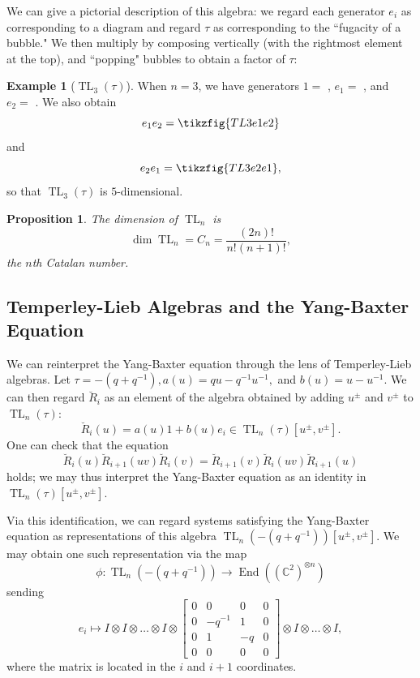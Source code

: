 \documentclass[12pt]{amsart}
\numberwithin{equation}{section}
\newtheorem{Proposition}[equation]{Proposition}
\theoremstyle{definition}
\newtheorem{Example}[equation]{Example}
\numberwithin{figure}{section}
\newcommand{\C}{\mathbb{C}}
\newcommand{\on}[1]{\operatorname{#1}}
\newcommand{\TeL}{\on{TL}}
\newcommand{\Rcheck}{\breve{R}}
\begin{document}
We can give a pictorial description of this algebra: we regard each generator $e_i$ as corresponding to a diagram
and regard $\tau$ as corresponding to the ``fugacity of a bubble." We then multiply by composing vertically (with the rightmost element at the top), and ``popping" bubbles to obtain a factor of $\tau$:

\begin{Example}[$\TeL_3(\tau)$]
	When $n=3$, we have generators $1 = $ , $e_1 = $ , and $e_2 = $ . We also obtain
	\[e_1 e_2 = \tikzfig{TL3e1e2}\]
	and 
	\[e_2 e_1 = \tikzfig{TL3e2e1},\]
	so that $\TeL_3(\tau)$ is $5$-dimensional.
\end{Example}



\begin{Proposition}
	The dimension of $\TeL_n$ is
	\[\dim \TeL_n = C_n = \frac{(2n)!}{n!(n+1)!},\]
	the $n$th Catalan number.
\end{Proposition}

\subsection{Temperley-Lieb Algebras and the Yang-Baxter Equation} We can reinterpret the Yang-Baxter equation through the lens of Temperley-Lieb algebras. Let $\tau = -(q+q^{-1}), a(u) = qu-q^{-1}u^{-1},$ and $b(u) = u-u^{-1}.$ We can then regard $\Rcheck_i$ as an element of the algebra obtained by adding $u^\pm$ and $v^\pm$ to $\TeL_n(\tau)$:
\[\Rcheck_i(u) = a(u) 1 + b(u) e_i \in \TeL_n(\tau)[u^{\pm}, v^{\pm}].\]
One can check that the equation
\[\Rcheck_i(u) \Rcheck_{i+1}(uv) \Rcheck_i(v) = \Rcheck_{i+1}(v) \Rcheck_{i}(uv) \Rcheck_{i+1}(u)\]
holds; we may thus interpret the Yang-Baxter equation as an identity in $\TeL_n(\tau)[u^{\pm}, v^{\pm}].$

Via this identification, we can regard systems satisfying the Yang-Baxter equation as representations of this algebra $\TeL_n(-(q+q^{-1}))[u^{\pm}, v^{\pm}].$ We may obtain one such representation via the map 
\[\phi: \TeL_n(-(q+q^{-1})) \rightarrow \on{End}((\C^2)^{\otimes n})\]
sending
\[e_i \mapsto I \otimes I \otimes \ldots \otimes  I \otimes 
\begin{bmatrix}
	0 & 0 & 0 & 0\\
	0 & -q^{-1} & 1 & 0\\
	0 & 1 & -q & 0\\
	0 & 0 & 0 & 0
\end{bmatrix} \otimes I \otimes \ldots \otimes I,\]
where the matrix is located in the $i$ and $i+1$ coordinates. 
\end{document}
